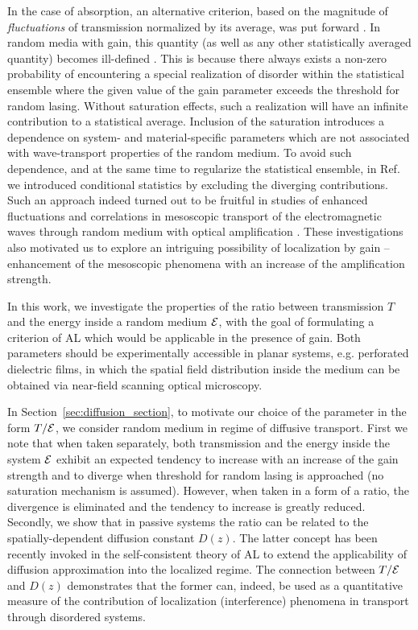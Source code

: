 In the case of absorption, an alternative criterion, based on the magnitude of {\it fluctuations} of transmission normalized by its average, was put forward \cite{2000_chabanov_nature}. In random media with gain, this quantity (as well as any other statistically averaged quantity) becomes ill-defined \cite{2005_Yamilov_correlations}. This is because there always exists a non-zero probability of encountering a special realization of disorder within the statistical ensemble where the given value of the gain parameter exceeds the threshold for random lasing\cite{2005_Cao}. Without saturation effects, such a realization will have an infinite contribution to a statistical average. Inclusion of the saturation introduces a dependence on system- and material-specific parameters which are not associated with wave-transport properties of the random medium. To avoid such dependence, and at the same time to regularize the statistical ensemble, in Ref. \cite{2005_Yamilov_correlations} we introduced conditional statistics by excluding the diverging contributions. Such an approach indeed turned out to be fruitful in studies of enhanced fluctuations and  correlations in mesoscopic transport of the electromagnetic waves through random medium with optical amplification \cite{2004_Yamilov_intensity,2005_Yamilov_correlations,2006_Yamilov_conductance}. These investigations also motivated us to explore an intriguing possibility of localization by gain -- enhancement of the mesoscopic phenomena with an increase of the amplification strength.

In this work, we investigate the properties of the ratio between transmission $T$ and the energy inside a random medium ${\cal E}$, with the goal of formulating a criterion of AL which would be applicable in the presence of gain. Both parameters should be experimentally accessible in planar systems, e.g. perforated dielectric films, in which the spatial field distribution inside the medium can be obtained via near-field scanning optical microscopy.

In Section~\ref{sec:diffusion_section}, to motivate our choice of the parameter in the form $T/{\cal E}$, we consider random medium in regime of diffusive transport. First we note that when taken separately, both transmission and the energy inside the system ${\cal E}$ exhibit an expected tendency to increase with an increase of the gain strength and to diverge when threshold for random lasing is approached (no saturation mechanism is assumed). However, when taken in a form of a ratio, the divergence is eliminated and the tendency to increase is greatly reduced. Secondly, we show that in passive systems the ratio can be related to the spatially-dependent diffusion constant $D(z)$. The latter concept has been recently invoked \cite{2008_Cherroret,2010_Payne_PRL} in the self-consistent theory of AL to extend the applicability of diffusion approximation into the localized regime. The connection between $T/{\cal E}$ and $D(z)$ demonstrates that the former can, indeed, be used as  a quantitative measure of the contribution of localization (interference) phenomena in transport through disordered systems.

